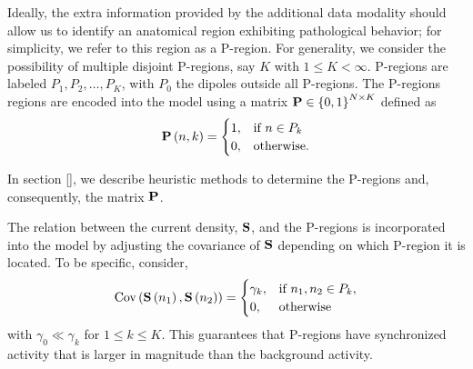 Ideally, the extra information provided by the additional data modality should allow us to identify an anatomical region exhibiting pathological behavior; for simplicity, we refer to this region as a P-region. 
%
%
%
For generality, we consider the possibility of multiple disjoint P-regions, say $K$ with $1\leq K < \infty$.
%
P-regions are labeled $P_1, P_2, \dots, P_K$, with $P_0$ the dipoles outside all P-regions.
%
The P-regions regions are encoded into the model using a matrix 
$\mathbf{P}\in \left\{ 0,1 \right\}^{N\times K}$ defined as
\begin{equation}
    \mathbf{P}\left( n,k \right) = \begin{cases}
        1, &\text{if } n \in P_k \\
        0, &\text{otherwise.}
    \end{cases}
\end{equation}

In section [], we describe heuristic methods to determine the P-regions and, consequently, the matrix $\mathbf{P}$.



The relation between the current density, $\mathbf{S}$, and the P-regions is incorporated into the model by adjusting the covariance of $\mathbf{S}$ depending on which P-region it is located.
%
To be specific, consider,
\begin{equation}
    \text{Cov}\left( \mathbf{S}\left( n_1 \right), \mathbf{S}\left( n_2 \right) \right) = 
    \begin{cases}
        \gamma_k, & \text{if } n_1, n_2\in P_k, \\
        0, & \text{otherwise}
    \end{cases}
\end{equation}
with $\gamma_0 \ll \gamma_k$ for $1\leq k \leq K$.
%
This guarantees that P-regions have synchronized activity that is larger in magnitude than the background activity.


